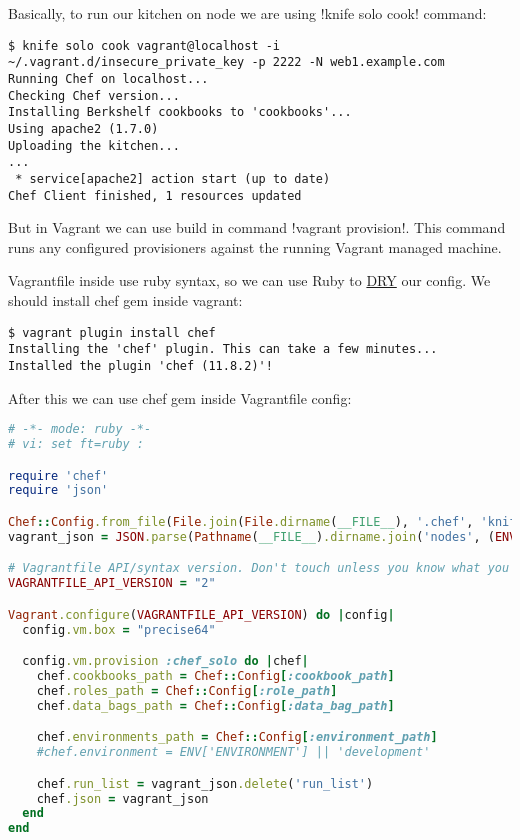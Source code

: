Basically, to run our kitchen on node we are using \inline!knife solo cook! command:

\begin{lstlisting}[label=lst:my-cloud-vagrant11]
$ knife solo cook vagrant@localhost -i ~/.vagrant.d/insecure_private_key -p 2222 -N web1.example.com
Running Chef on localhost...
Checking Chef version...
Installing Berkshelf cookbooks to 'cookbooks'...
Using apache2 (1.7.0)
Uploading the kitchen...
...
 * service[apache2] action start (up to date)
Chef Client finished, 1 resources updated
\end{lstlisting}

But in Vagrant we can use build in command \inline!vagrant provision!. This command runs any configured provisioners against the running Vagrant managed machine.

Vagrantfile inside use ruby syntax, so we can use Ruby to \href{http://en.wikipedia.org/wiki/Dont\_repeat\_yourself}{DRY} our config. We should install chef gem inside vagrant:

\begin{lstlisting}[label=lst:my-cloud-vagrant6]
$ vagrant plugin install chef
Installing the 'chef' plugin. This can take a few minutes...
Installed the plugin 'chef (11.8.2)'!
\end{lstlisting}

After this we can use chef gem inside Vagrantfile config:

\begin{lstlisting}[language=Ruby,label=lst:my-cloud-vagrant7,title=my-cloud/nodes/Vagrantfile]
# -*- mode: ruby -*-
# vi: set ft=ruby :

require 'chef'
require 'json'

Chef::Config.from_file(File.join(File.dirname(__FILE__), '.chef', 'knife.rb'))
vagrant_json = JSON.parse(Pathname(__FILE__).dirname.join('nodes', (ENV['NODE'] || 'web1.example.com.json')).read)

# Vagrantfile API/syntax version. Don't touch unless you know what you're doing!
VAGRANTFILE_API_VERSION = "2"

Vagrant.configure(VAGRANTFILE_API_VERSION) do |config|
  config.vm.box = "precise64"

  config.vm.provision :chef_solo do |chef|
    chef.cookbooks_path = Chef::Config[:cookbook_path]
    chef.roles_path = Chef::Config[:role_path]
    chef.data_bags_path = Chef::Config[:data_bag_path]

    chef.environments_path = Chef::Config[:environment_path]
    #chef.environment = ENV['ENVIRONMENT'] || 'development'

    chef.run_list = vagrant_json.delete('run_list')
    chef.json = vagrant_json
  end
end
\end{lstlisting}

